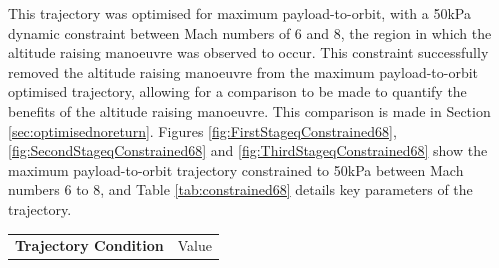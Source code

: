 		 This trajectory was optimised for maximum payload-to-orbit, with a 50kPa dynamic constraint between Mach numbers of 6 and 8, the region in which the altitude raising manoeuvre was observed to occur. This constraint successfully removed the altitude raising manoeuvre from the maximum payload-to-orbit optimised trajectory, allowing for a comparison to be made to quantify the benefits of the altitude raising manoeuvre. This comparison is made in Section \ref{sec:optimisednoreturn}. Figures \ref{fig:FirstStageqConstrained68},  \ref{fig:SecondStageqConstrained68} and \ref{fig:ThirdStageqConstrained68} show the maximum payload-to-orbit trajectory constrained to 50kPa between Mach numbers 6 to 8, and Table \ref{tab:constrained68} details key parameters of the trajectory. 
		
	\begin{table}[ht]%
	\centering
\begin{tabular}{l c } 
	\hline \textbf{Trajectory Condition}
	& Value


\end{tabular}
\end{table}
